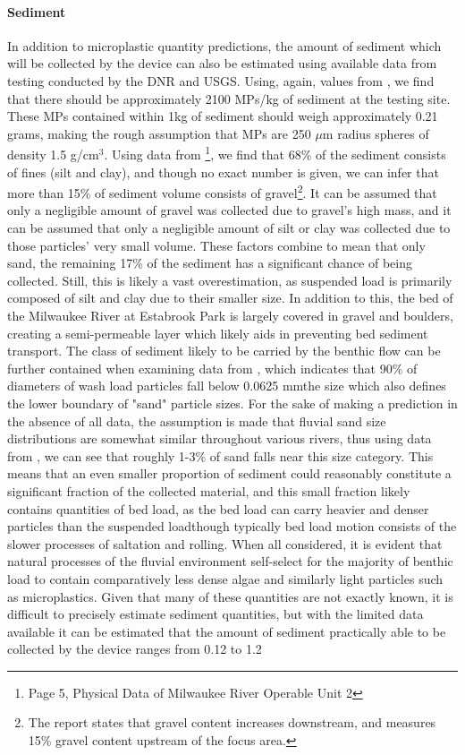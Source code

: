 \documentclass[fleqn,10pt]{SelfArx} %
\begin{document}
	\paragraph{Sediment}
	In addition to microplastic quantity predictions, the amount of sediment which will be collected by the device can also be estimated using available data from testing conducted by the DNR and USGS. Using, again, values from \cite{LenakerEtAlvertdist}, we find that there should be approximately 2100 MPs/kg of sediment at the testing site. These MPs contained within 1kg of sediment should weigh approximately 0.21 grams, making the rough assumption that MPs are 250 $\mu$m radius spheres of density 1.5 g/cm$^3$. Using data from \cite{Foth2020}\footnote{Page 5, Physical Data of Milwaukee River Operable Unit 2}, we find that 68\% of the sediment consists of fines (silt and clay), and though no exact number is given, we can infer that more than 15\% of sediment volume consists of gravel\footnote{The report states that gravel content increases downstream, and measures 15\% gravel content upstream of the focus area.}. It can be assumed that only a negligible amount of gravel was  collected due to gravel's high mass, and it can be assumed that only a negligible amount of silt or clay was collected due to those particles' very small volume. These factors combine to mean that only sand, the remaining 17\% of the sediment has a significant chance of being collected. Still, this is likely a vast overestimation, as suspended load is primarily composed of silt and clay due to their smaller size. In addition to this, the bed of the Milwaukee River at Estabrook Park is largely covered in gravel and boulders, creating a semi-permeable layer which likely aids in preventing bed sediment transport. The class of sediment likely to be carried by the \gls{benthic} flow can be further contained when examining data from \cite{Washload_size}, which indicates that 90\% of diameters of wash load particles fall below 0.0625 mm\textemdash the size which also defines the lower boundary of "sand" particle sizes. For the sake of making a prediction in the absence of all data, the assumption is made that fluvial sand size distributions are somewhat similar throughout various rivers, thus using data from \cite{sabd_size_distribution}, we can see that roughly 1-3\% of sand falls near this size category. This means that an even smaller proportion of sediment could reasonably constitute a significant fraction of the collected material, and this small fraction likely contains quantities of bed load, as the bed load can carry heavier and denser particles than the suspended load\textemdash though typically bed load motion consists of the slower processes of \gls{saltation} and \gls{rolling}. When all considered, it is evident that natural processes of the fluvial environment self-select for the majority of \gls{benthic} load to contain comparatively less dense algae and similarly light particles such as microplastics. Given that many of these quantities are not exactly known, it is difficult to precisely estimate sediment quantities, but with the limited data available it can be estimated that the amount of sediment practically able to be collected by the device ranges from 0.12 to 1.2 
\end{document}
